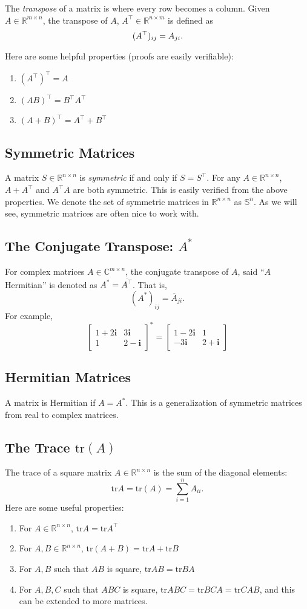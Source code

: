 \documentclass{article}
\newcommand{\1}{\mathbf{1}}
\newcommand{\tr}{\mathrm{tr}}
\newcommand{\0}{\mathbf{0}}
\newcommand{\ii}{\mathbf{i}}
\newcommand{\RR}{\mathbb{R}}
\newcommand{\CC}{\mathbb{C}}
\renewcommand{\SS}{\mathbb{S}}
\newcommand{\T}{\top}
\newcommand{\m}[1]{\begin{bmatrix} #1 \end{bmatrix}}
\begin{document}
The \textit{transpose} of a matrix is where every row becomes a column. Given
$A\in\RR^{m\times n}$, the transpose of $A$, $A^\T\in\RR^{n\times m}$ is defined
as
\[
    (A^\T)_{ij} = A_{ji}.\\
\]

Here are some helpful properties (proofs are easily verifiable):
\begin{enumerate}[-]
\item $(A^\T)^\T = A$
\item $(AB)^\T = B^\T A^\T$
\item $(A+B)^\T = A^\T + B^\T$
\end{enumerate}

\subsection{Symmetric Matrices}

A matrix $S\in\RR^{n\times n}$ is \textit{symmetric} if and only if
$S = S^\T$. For any $A\in\RR^{n\times n}$, $A+A^\T$ and $A^\T A$
are both symmetric. This is easily verified from the above properties.
We denote the set of symmetric matrices in $\RR^{n\times n}$ as $\SS^n$.
As we will see, symmetric matrices are often nice to work with.

\subsection{The Conjugate Transpose: $A^*$}

For complex matrices $A\in\CC^{m\times n}$, the conjugate transpose of
$A$, said ``$A$ Hermitian'' is denoted as $A^* = \overline{A^\T}$.
That is,
\[
    (A^*)_{ij} = \overline{A}_{ji}.
\]
For example,
\[
    \m{1+2\ii & 3\ii\\ 1 & 2-\ii}^* = \m{1-2\ii&1\\-3\ii&2+\ii}
\]

\subsection{Hermitian Matrices}

A matrix is Hermitian if $A = A^*$. This is a generalization of symmetric
matrices from real to complex matrices.

\subsection{The Trace $\tr(A)$}

The trace of a square matrix $A\in\RR^{n\times n}$ is the sum of the diagonal
elements:
\[
    \tr A = \tr(A) = \sum_{i=1}^n A_{ii}.
\]
Here are some useful properties:
\begin{enumerate}[-]
\item For $A\in\RR^{n\times n}$, $\tr A = \tr A^\T$
\item For $A,B\in\RR^{n\times n}$, $\tr(A+B) = \tr A + \tr B$
\item For $A,B$ such that $AB$ is square, $\tr AB = \tr BA$
\item For $A,B,C$ such that $ABC$ is square, $\tr ABC = \tr BCA
    = \tr CAB$, and this can be extended to more matrices.
\end{enumerate}
\end{document}
